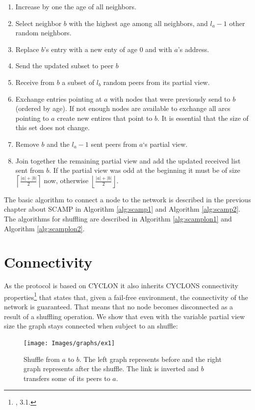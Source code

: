 \documentclass[11pt, english, screen]{report-rd-info}
\begin{document}
\begin{enumerate}
    \item Increase by one the age of all neighbors.
    \item{Select neighbor $b$ with the highest age among all neighbors, and $l_a-1$ other random neighbors.}
    \item{Replace $b$'s entry with a new enty of age 0 and with $a$'s address.}
    \item{Send the updated subset to peer $b$}
    \item{Receive from $b$ a subset of $l_b$ random peers from its partial view.}
    \item{Exchange entries pointing at $a$ with nodes that were previously send to $b$ (ordered by age). If not enough nodes are available to exchange all arcs pointing to $a$ create new entires that point to $b$. It is essential that the size of this set does not change.}
    \item Remove $b$ and the $l_a-1$ sent peers from $a$`s partial view. 
    \item{Join together the remaining partial view and add the updated received list sent from $b$. If the partial view was odd at the beginning it must be of size $\left \lceil{\frac{|a|+|b|}{2}}\right \rceil$ now, otherwise $\left \lfloor{\frac{|a|+|b|}{2}}\right \rfloor$.}
\end{enumerate}

The basic algorithm to connect a node to the network is described in the previous chapter about SCAMP in Algorithm \ref{alg:scamp1} and Algorithm \ref{alg:scamp2}.
The algorithms for shuffling are described in Algorithm \ref{alg:scamplon1} and Algorithm \ref{alg:scamplon2}.

\section{Connectivity}

As the protocol is based on CYCLON it also inherits CYCLONS connectivity properties\footnote{\cite{Voulgaris05cyclon:inexpensive}, 3.1.} that states that, given a fail-free environment, the connectivity of the network is guaranteed.
That means that no node becomes disconnected as a result of a shuffling operation.
We show that even with the variable partial view size the graph stays connected when subject to an shuffle:

\begin{figure}
    \centering
    \texttt{[image: Images/graphs/ex1]}
    \caption{Shuffle from $a$ to $b$. The left graph represents before and the right graph represents after the shuffle. The link is inverted and $b$ transfers some of its peers to $a$.}
    \label{fig:ex1}
\end{figure}
\end{document}
